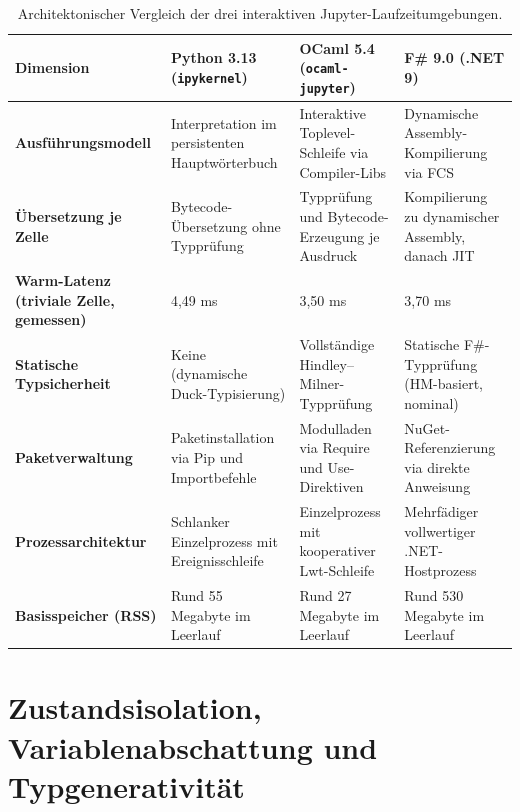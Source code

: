 \begin{table}[htbp]
  \centering
  \footnotesize
  \caption{Architektonischer Vergleich der drei interaktiven Jupyter-Laufzeitumgebungen.}
  \label{tab:kernel_architectures}
  \begin{tabularx}{\textwidth}{lXXX}
    \toprule
    \textbf{Dimension} & \textbf{Python 3.13 (\texttt{ipykernel})} & \textbf{OCaml 5.4 (\texttt{ocaml-jupyter})} & \textbf{F\# 9.0 (.NET 9)} \\
    \midrule
    \textbf{Ausführungsmodell} &
      Interpretation im persistenten Hauptwörterbuch &
      Interaktive Toplevel-Schleife via Compiler-Libs &
      Dynamische Assembly-Kompilierung via FCS \\
    \addlinespace[3pt]
    \textbf{Übersetzung je Zelle} &
      Bytecode-Übersetzung ohne Typprüfung &
      Typprüfung und Bytecode-Erzeugung je Ausdruck &
      Kompilierung zu dynamischer Assembly, danach JIT \\
    \addlinespace[3pt]
    \textbf{Warm-Latenz (triviale Zelle, gemessen)} &
      4,49 ms &
      3,50 ms &
      3,70 ms \\
    \addlinespace[3pt]
    \textbf{Statische Typsicherheit} &
      Keine (dynamische Duck-Typisierung) &
      Vollständige Hindley--Milner-Typprüfung &
      Statische F\#-Typprüfung (HM-basiert, nominal) \\
    \addlinespace[3pt]
    \textbf{Paketverwaltung} &
      Paketinstallation via Pip und Importbefehle &
      Modulladen via Require und Use-Direktiven &
      NuGet-Referenzierung via direkte Anweisung \\
    \addlinespace[3pt]
    \textbf{Prozessarchitektur} &
      Schlanker Einzelprozess mit Ereignisschleife &
      Einzelprozess mit kooperativer Lwt-Schleife &
      Mehrfädiger vollwertiger .NET-Hostprozess \\
    \addlinespace[3pt]
    \textbf{Basisspeicher (RSS)} &
      Rund 55 Megabyte im Leerlauf &
      Rund 27 Megabyte im Leerlauf &
      Rund 530 Megabyte im Leerlauf \\
    \bottomrule
  \end{tabularx}
\end{table}

\section{Zustandsisolation, Variablenabschattung und Typgenerativität}
\label{sec:kernels_state_hazards}

